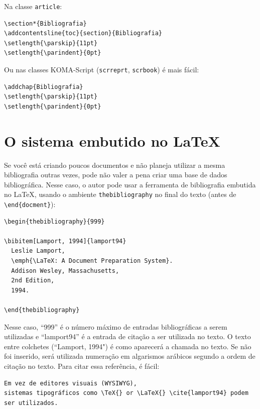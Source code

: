 Na classe \texttt{article}:

\begin{verbatim}
\section*{Bibliografia}
\addcontentsline{toc}{section}{Bibliografia}
\setlength{\parskip}{11pt}
\setlength{\parindent}{0pt}
\end{verbatim}

Ou nas classes KOMA-Script (\texttt{scrreprt}, \texttt{scrbook}) é mais fácil:

\begin{verbatim}
\addchap{Bibliografia}
\setlength{\parskip}{11pt}
\setlength{\parindent}{0pt}
\end{verbatim}

\section{O sistema embutido no LaTeX}
\label{bibliografia-latex-embutido}
Se você está criando poucos documentos e não planeja utilizar a mesma bibliografia outras vezes, pode não valer a pena criar uma base de dados bibliográfica. Nesse caso, o autor pode usar a ferramenta de bibliografia embutida no LaTeX, usando o ambiente \texttt{thebibliography} no final do texto (antes de \verb+\end{docment}+):

\begin{verbatim}
\begin{thebibliography}{999}

\bibitem[Lamport, 1994]{lamport94}
  Leslie Lamport,
  \emph{\LaTeX: A Document Preparation System}.
  Addison Wesley, Massachusetts,
  2nd Edition,
  1994.

\end{thebibliography}
\end{verbatim}

Nesse caso, “999” é o número máximo de entradas bibliográficas a serem utilizadas e “lamport94” é a entrada de citação a ser utilizada no texto. O texto entre colchetes (``Lamport, 1994") é como aparecerá a chamada no texto. Se não foi inserido, será utilizada numeração em algarismos arábicos segundo a ordem de citação no texto. Para citar essa referência, é fácil: 


\begin{verbatim}
Em vez de editores visuais (WYSIWYG), 
sistemas tipográficos como \TeX{} or \LaTeX{} \cite{lamport94} podem ser utilizados.
\end{verbatim}

